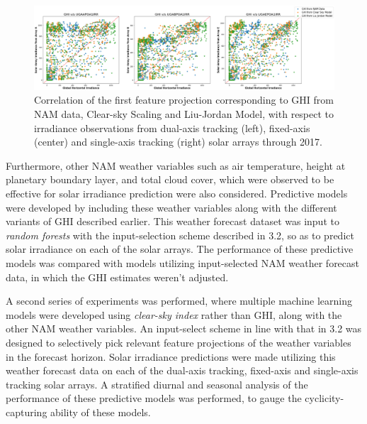 \begin{figure}[ht]
    \begin{center}
    	\includegraphics[width=\textwidth]{chapter4/fig_ghi_irradiance.png}
    	\caption[GHI from NAM data, Clear-sky Scaling and Liu-Jordan against irradiance observations from dual-axis tracking, fixed-axis, single-axis tracking solar arrays through 2017.]{Correlation of the first feature projection corresponding to GHI from NAM data, Clear-sky Scaling and Liu-Jordan Model, with respect to irradiance observations from dual-axis tracking (left), fixed-axis (center) and single-axis tracking (right) solar arrays through 2017.}
    	\label{fig:fig_ghi_irradiance}
    \end{center}
\end{figure}

\par Furthermore, other NAM weather variables such as air temperature, height at planetary boundary layer, and total cloud cover, which were observed to be effective for solar irradiance prediction were also considered. 
Predictive models were developed by including these weather variables along with the different variants of GHI described earlier. This weather forecast dataset was input to \textit{random forests} with the input-selection scheme described in 3.2, so as to predict solar irradiance on each of the solar arrays. The performance of these predictive models was compared with models utilizing input-selected NAM weather forecast data, in which the GHI estimates weren't adjusted. 

\par A second series of experiments was performed, where multiple machine learning models were developed using \textit{clear-sky index} rather than GHI, along with the other NAM weather variables. An input-select scheme in line with that in 3.2 was designed to selectively pick relevant feature projections of the weather variables in the forecast horizon. Solar irradiance predictions were made utilizing this weather forecast data on each of the dual-axis tracking, fixed-axis and single-axis tracking solar arrays. A stratified diurnal and seasonal analysis of the performance of these predictive models was performed, to gauge the cyclicity-capturing ability of these models.

